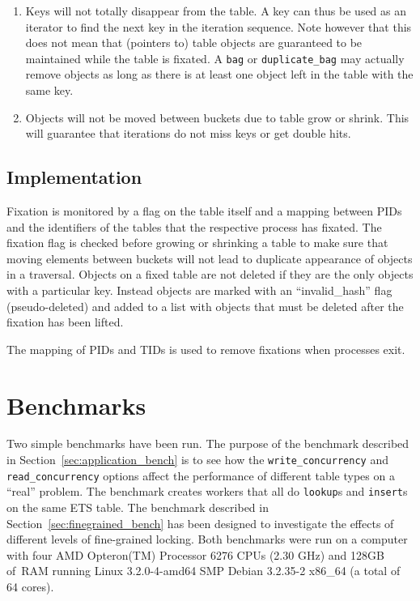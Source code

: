 \documentclass[aps,pre,preprint,nofootinbib]{revtex4}
\begin{document}
\begin{enumerate}
\item Keys will not totally disappear from the table.
  A key can thus be used as an iterator to find the next key in the iteration sequence.
  Note however that this does not mean that (pointers to) table objects are guaranteed to be maintained while the table is fixated.
  A \verb|bag| or \verb|duplicate_bag| may actually remove objects as long as there is at least one object left in the table with the same key.
\item Objects will not be moved between buckets due to table grow or shrink.
  This will guarantee that iterations do not miss keys or get double hits.
\end{enumerate}

\subsection{Implementation}

Fixation is monitored by a flag on the table itself and a mapping between PIDs and the identifiers of the tables that the respective process has fixated.
The fixation flag is checked before growing or shrinking a table to make sure that moving elements between buckets will not lead to duplicate appearance of objects in a traversal.
Objects on a fixed table are not deleted if they are the only objects with a particular key.
Instead objects are marked with an ``invalid\_hash'' flag (pseudo-deleted) and added to a list with objects that must be deleted after the fixation has been lifted.

The mapping of PIDs and TIDs is used to remove fixations when processes exit.

\section{Benchmarks} \label{sec:benchmark}

Two simple benchmarks have been run.
The purpose of the benchmark described in Section~\ref{sec:application_bench} is to see how the \verb|write_concurrency| and \verb|read_concurrency| options affect the performance of different table types on a ``real'' problem.
The benchmark creates workers that all do \verb|lookup|s and \verb|insert|s on the same ETS table.
The benchmark described in Section~\ref{sec:finegrained_bench} has been designed to investigate the effects of different levels of fine-grained locking.
Both benchmarks were run on a computer with four AMD Opteron(TM) Processor 6276 CPUs (2.30 GHz) and 128GB of~RAM running Linux 3.2.0-4-amd64 SMP Debian 3.2.35-2 x86\_64 (a total of 64 cores).
\end{document}
